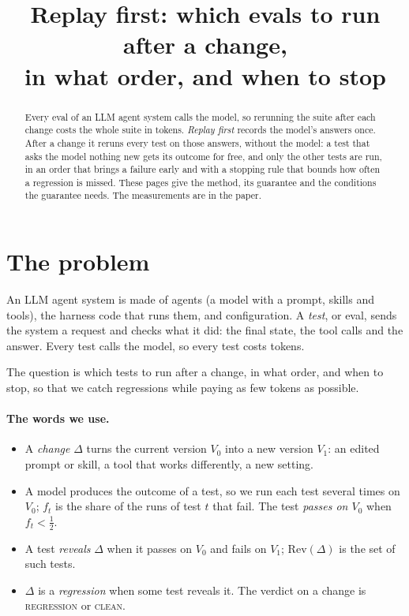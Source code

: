 \documentclass[11pt,a4paper]{article}
\title{Replay first: which evals to run after a change,\\ in what order, and when to stop}
\date{}
\begin{document}
\maketitle
\vspace{-1.5cm}

\begin{abstract}
\noindent Every eval of an LLM agent system calls the model, so rerunning the suite after each change costs the
whole suite in tokens. \emph{Replay first} records the model's answers once. After a change it reruns every test
on those answers, without the model: a test that asks the model nothing new gets its outcome for free, and only
the other tests are run, in an order that brings a failure early and with a stopping rule that bounds how often a
regression is missed. These pages give the method, its guarantee and the conditions the guarantee needs. The
measurements are in the paper.
\end{abstract}

\section{The problem}
\label{sec:problem}

An LLM agent system is made of agents (a model with a prompt, skills and tools), the harness code that runs them,
and configuration. A \emph{test}, or eval, sends the system a request and checks what it did: the final state, the
tool calls and the answer. Every test calls the model, so every test costs tokens.

The question is which tests to run after a change, in what order, and when to stop, so that we catch regressions
while paying as few tokens as possible.

\paragraph{The words we use.}
\begin{itemize}
  \item A \emph{change} $\Delta$ turns the current version $V_0$ into a new version $V_1$: an edited prompt or
        skill, a tool that works differently, a new setting.
  \item A model produces the outcome of a test, so we run each test several times on $V_0$; $f_t$ is the share of
        the runs of test $t$ that fail. The test \emph{passes on $V_0$} when $f_t < \frac12$.
  \item A test \emph{reveals} $\Delta$ when it passes on $V_0$ and fails on $V_1$; $\mathrm{Rev}(\Delta)$ is the
        set of such tests.
  \item $\Delta$ is a \emph{regression} when some test reveals it. The verdict on a change is \textsc{regression}
        or \textsc{clean}.
\end{itemize}
\end{document}
